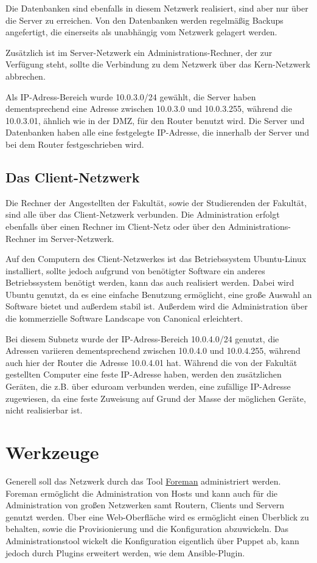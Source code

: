 Die Datenbanken sind ebenfalls in diesem Netzwerk realisiert, sind aber nur über die Server zu erreichen. Von den Datenbanken werden regelmäßig Backups angefertigt, die einerseits als unabhängig vom Netzwerk gelagert werden.

Zusätzlich ist im Server-Netzwerk ein Administrations-Rechner, der zur Verfügung steht, sollte die Verbindung zu dem Netzwerk über das Kern-Netzwerk abbrechen.

Als IP-Adress-Bereich wurde 10.0.3.0/24 gewählt, die Server haben dementsprechend eine Adresse zwischen 10.0.3.0 und 10.0.3.255, während die 10.0.3.01, ähnlich wie in der DMZ, für den Router benutzt wird. Die Server und Datenbanken haben alle eine festgelegte IP-Adresse, die innerhalb der Server und bei dem Router festgeschrieben wird.

\subsection{Das Client-Netzwerk}
Die Rechner der Angestellten der Fakultät, sowie der Studierenden der Fakultät, sind alle über das Client-Netzwerk verbunden. Die Administration erfolgt ebenfalls über einen Rechner im Client-Netz oder über den Administrations-Rechner im Server-Netzwerk.

Auf den Computern des Client-Netzwerkes ist das Betriebssystem Ubuntu-Linux installiert, sollte jedoch aufgrund von benötigter Software ein anderes Betriebssystem benötigt werden, kann das auch realisiert werden. Dabei wird Ubuntu genutzt, da es eine einfache Benutzung ermöglicht, eine große Auswahl an Software bietet und außerdem stabil ist. Außerdem wird die Administration über die kommerzielle Software Landscape von Canonical erleichtert.

Bei diesem Subnetz wurde der IP-Adress-Bereich 10.0.4.0/24 genutzt, die Adressen variieren dementsprechend zwischen 10.0.4.0 und 10.0.4.255, während auch hier der Router die Adresse 10.0.4.01 hat. Während die von der Fakultät gestellten Computer eine feste IP-Adresse haben, werden den zusätzlichen Geräten, die z.B. über eduroam verbunden werden, eine zufällige IP-Adresse zugewiesen, da eine feste Zuweisung auf Grund der Masse der möglichen Geräte, nicht realisierbar ist.

\section{Werkzeuge}
Generell soll das Netzwerk durch das Tool \href{www.theforeman.org}{Foreman} administriert werden. Foreman ermöglicht die Administration von Hosts und kann auch für die Administration von großen Netzwerken samt Routern, Clients und Servern genutzt werden. Über eine Web-Oberfläche wird es ermöglicht einen Überblick zu behalten, sowie die Provisionierung und die Konfiguration abzuwickeln.
Das Administrationstool wickelt die Konfiguration eigentlich über Puppet ab, kann jedoch durch Plugins erweitert werden, wie dem Ansible-Plugin. 

